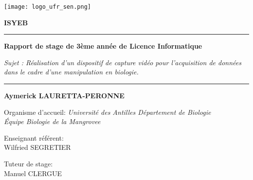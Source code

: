 \begin{titlepage}
    \begin{center}
        \vspace*{0.5cm}

        \texttt{[image: logo\_ufr\_sen.png]}
        \hspace{2cm}

        \vspace{0.5cm}

        \textbf{\Huge{ISYEB}}

        \vspace{0.5cm}

        \rule{\linewidth}{0.5mm}
        \textbf{Rapport de stage de 3ème année de Licence Informatique} 
        
        \vspace{0.2cm}

        \small{\textit{Sujet : Réalisation d'un dispositif de capture vidéo pour l’acquisition de données dans le cadre d’une manipulation en biologie.}}
        \rule{\linewidth}{0.5mm}

        \vspace{2cm}
    
        \textbf{Aymerick LAURETTA-PERONNE} \\

        \vfill
                
		{\large Organisme d'accueil: \textsl{Université des Antilles Département de Biologie}} \\[0.1cm]
        \small{\textit{Équipe Biologie de la Mangrovee}} \\[1cm]
    
		\begin{minipage}{0.7\textwidth}
			\begin{flushleft}
				Enseignant référent: \\
				\hspace{0.2cm} Wilfried \textsc{SEGRETIER}
			\end{flushleft}
		\end{minipage}
        
		\vspace{-0.69cm}
		\hspace{9cm}
		\begin{minipage}{0.3\textwidth}
			\begin{flushleft}
				Tuteur de stage: \\
				\hspace{0.2cm} Manuel \textsc{CLERGUE}


\end{flushleft}
\end{minipage}
\end{center}
\end{titlepage}
